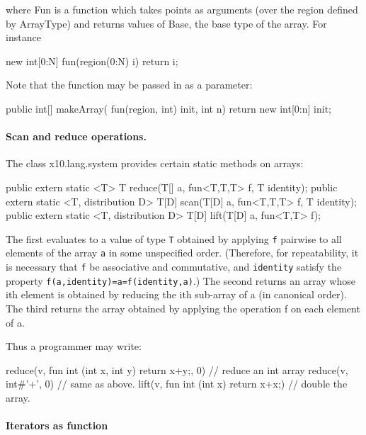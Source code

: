 \noindent where {\cf Fun} is a function which takes points as
arguments (over the region defined by {\cf ArrayType}) and returns
values of Base, the base type of the array. For instance

\begin{x10}
   new int[0:N] fun(region(0:N) i) { return i; }  
\end{x10}

Note that the function may be passed in as a parameter:
\begin{x10}
    public int[] makeArray( fun(region, int) init, int n) {
         return new int[0:n] init;
    }
\end{x10}

\paragraph{Scan and reduce operations.}

The class {\cf x10.lang.system} provides certain static methods on arrays:

\begin{x10}
  public extern static <T> T reduce(T[] a, fun<T,T,T> f, T identity);
  public extern static <T, distribution D> T[D] scan(T[D] a, fun<T,T,T> f, T identity);
  public extern static <T, distribution D> T[D] lift(T[D] a, fun<T,T> f);
\end{x10}

The first evaluates to a value of type {\tt T} obtained by applying
{\tt f} pairwise to all elements of the array {\tt a} in some
unspecified order.  (Therefore, for repeatability, it is necessary
that {\tt f} be associative and commutative, and {\tt identity}
satisfy the property {\tt f(a,identity)=a=f(identity,a)}.) The second
returns an array whose {\cf i}th element is obtained by reducing the
{\cf i}th sub-array of {\cf a} (in canonical order). The third returns
the array obtained by applying the operation {\cf f} on each element
of {\cf a}.

Thus a programmer may write:
\begin{x10}
    reduce(v, fun int (int x, int y) { return x+y;}, 0)  // reduce an int array
    reduce(v, int#'+', 0)  // same as above.
    lift(v, fun int (int x) {return x+x;}) // double the array.  
\end{x10}

\paragraph{Iterators as function}

